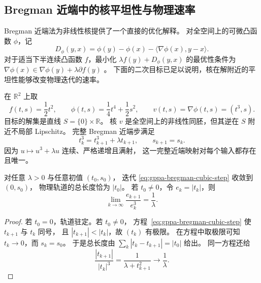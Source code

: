\subsection{Bregman 近端中的核平坦性与物理速率}
\label{subsec:gppa-bregman-quartic}

Bregman 近端法为非线性核提供了一个直接的优化解释。
对全空间上的可微凸函数 $\phi$，记
\[
 D_\phi(y,x)=\phi(y)-\phi(x)-\langle\nabla\phi(x),y-x\rangle.
\]
对于适当下半连续凸函数 $f$，最小化 $\lambda f(y)+D_\phi(y,x)$ 的最优性条件为
$\nabla\phi(x)\in\nabla\phi(y)+\lambda\partial f(y)$
\cite{BauschkeBorweinCombettes2003}。
下面的二次目标已足以说明，核在解附近的平坦性能够改变物理迭代的速率。

在 $\mathbb R^2$ 上取
\[
 f(t,s)=\frac12t^2,\qquad
 \phi(t,s)=\frac14t^4+\frac12s^2,
 \qquad v(t,s)=\nabla\phi(t,s)=(t^3,s).
\]
目标的解集是直线 $S=\{0\}\times\mathbb R$。
核 $v$ 是全空间上的非线性同胚，但其逆在 $S$ 附近不局部 Lipschitz。
完整 Bregman 近端步满足
\begin{equation}
\label{eq:gppa-bregman-cubic-step}
 t_k^3=t_{k+1}^3+\lambda t_{k+1},\qquad
 s_{k+1}=s_k.
\end{equation}
因为 $u\mapsto u^3+\lambda u$ 连续、严格递增且满射，
这一完整近端映射对每个输入都存在且唯一。

\begin{proposition}
\label{prop:gppa-bregman-cubic}
对任意 $\lambda>0$ 与任意初值 $(t_0,s_0)$，
迭代 \eqref{eq:gppa-bregman-cubic-step} 收敛到 $(0,s_0)$，
物理轨道的总长度恰为 $|t_0|$。
若 $t_0\ne0$，令 $e_k=|t_k|$，则
\[
 \lim_{k\to\infty}\frac{e_{k+1}}{e_k^3}=\frac1\lambda.
\]
\end{proposition}
\begin{proof}
若 $t_0=0$，轨道驻定。若 $t_0\ne0$，
方程~\eqref{eq:gppa-bregman-cubic-step} 使 $t_{k+1}$ 与 $t_k$ 同号，
且 $|t_{k+1}|<|t_k|$，故 $(t_k)$ 有极限。
在方程中取极限可知 $t_k\to0$，而 $s_k=s_0$。
于是总长度由 $\sum_k|t_k-t_{k+1}|=|t_0|$ 给出。
同一方程还给
\[
 \frac{|t_{k+1}|}{|t_k|^3}
 =\frac1{\lambda+t_{k+1}^2}\longrightarrow\frac1\lambda.
\]
\end{proof}

